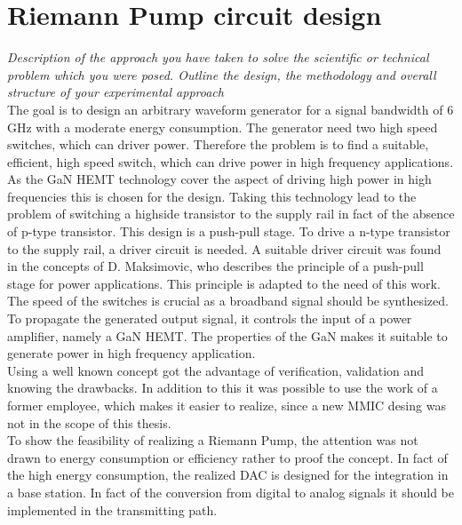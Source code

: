 \chapter{Riemann Pump circuit design}
\label{ch:design}
\textit{Description of the approach you have taken to solve the scientific or technical problem which you were posed. Outline the design, the methodology and overall structure of your experimental approach}\\

The goal is to design an arbitrary waveform generator for a signal bandwidth of 6 GHz with a moderate energy consumption. 
The generator need two high speed switches, which can driver power.
Therefore the problem is to find a suitable, efficient, high speed switch, which can drive power in high frequency applications.
As the GaN HEMT technology cover the aspect of driving high power in high frequencies this is chosen for the design.
Taking this technology lead to the problem of switching a highside transistor to the supply rail in fact of the absence of p-type transistor.
This design is a push-pull stage.
To drive a n-type transistor to the supply rail, a driver circuit is needed.
A suitable driver circuit was found in the concepts of D. Maksimovic, who describes the principle of a push-pull stage for power applications.
This principle is adapted to the need of this work.
The speed of the switches is crucial as a broadband signal should be synthesized.
To propagate the generated output signal, it controls the input of a power amplifier, namely a GaN HEMT.
The properties of the GaN makes it suitable to generate power in high frequency application.
\\
Using a well known concept got the advantage of verification, validation and knowing the drawbacks.
In addition to this it was possible to use the work of a former employee, which makes it easier to realize, since a new MMIC desing was not in the scope of this thesis.
\\
To show the feasibility of realizing a Riemann Pump, the attention was not drawn to energy consumption or efficiency rather to proof the concept.
In fact of the high energy consumption, the realized DAC is designed for the integration in a base station.
In fact of the conversion from digital to analog signals it should be implemented in the transmitting path.

